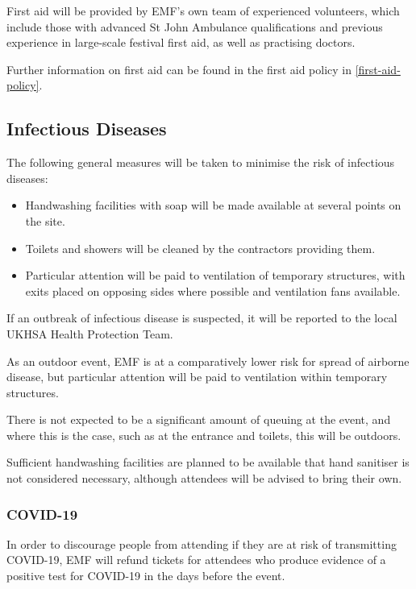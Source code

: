 First aid will be provided by EMF's own team of experienced volunteers,
which include those with advanced St John Ambulance qualifications and previous
experience in large-scale festival first aid, as well as practising doctors.

Further information on first aid can be found in the first aid policy in
\cref{first-aid-policy}.

\subsection{Infectious Diseases}

The following general measures will be taken to minimise the risk of infectious diseases:
\begin{itemize}
    \tightlist
    \item Handwashing facilities with soap will be made available at several points on the site.
    \item Toilets and showers will be cleaned by the contractors providing them.
    \item Particular attention will be paid to ventilation of temporary structures, with
          exits placed on opposing sides where possible and ventilation fans available.
\end{itemize}

If an outbreak of infectious disease is suspected, it will be reported to the local
UKHSA Health Protection Team.

As an outdoor event, EMF is at a comparatively lower risk for spread of airborne disease,
but particular attention will be paid to ventilation within temporary structures.

There is not expected to be a significant amount of queuing at the event, and where this is
the case, such as at the entrance and toilets, this will be outdoors.

Sufficient handwashing facilities are planned to be available that hand sanitiser is not
considered necessary, although attendees will be advised to bring their own.

\subsubsection{COVID-19}

In order to discourage people from attending if they are at risk of transmitting COVID-19,
EMF will refund tickets for attendees who produce evidence of a positive test for COVID-19
in the days before the event.

